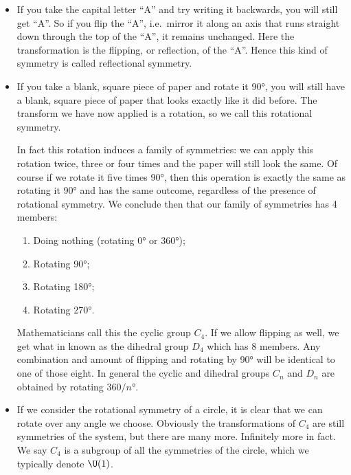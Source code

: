 \begin{itemize}
\item If you take the capital letter ``A'' and try writing it backwards, you will still get ``A''. So if you flip the ``A'', i.e.\ mirror it along an axis that runs straight down through the top of the ``A'', it remains unchanged. Here the transformation is the flipping, or reflection, of the ``A''. Hence this kind of symmetry is called reflectional symmetry.
\item If you take a blank, square piece of paper and rotate it \ang{90}, you will still have a blank, square piece of paper that looks exactly like it did before. The transform we have now applied is a rotation, so we call this rotational symmetry.

In fact this rotation induces a family of symmetries: we can apply this rotation twice, three or four times and the paper will still look the same. Of course if we rotate it five times \ang{90}, then this operation is exactly the same as rotating it \ang{90} and has the same outcome, regardless of the presence of rotational symmetry. We conclude then that our family of symmetries has 4 members:
\begin{enumerate}
\item Doing nothing (rotating \ang{0} or \ang{360});
\item Rotating \ang{90};
\item Rotating \ang{180};
\item Rotating \ang{270}.
\end{enumerate}
Mathematicians call this the cyclic group $C_4$. If we allow flipping as well, we get what in known as the dihedral group $D_4$ which has 8 members. Any combination and amount of flipping and rotating by \ang{90} will be identical to one of those eight. In general the cyclic and dihedral groups $C_n$ and $D_n$ are obtained by rotating $360/n\si{\degree}$.
\item If we consider the rotational symmetry of a circle, it is clear that we can rotate over any angle we choose. Obviously the transformations of $C_4$ are still symmetries of the system, but there are many more. Infinitely more in fact. We say $C_4$ is a subgroup of all the symmetries of the circle, which we typically denote $\U(1)$.


\end{itemize}
